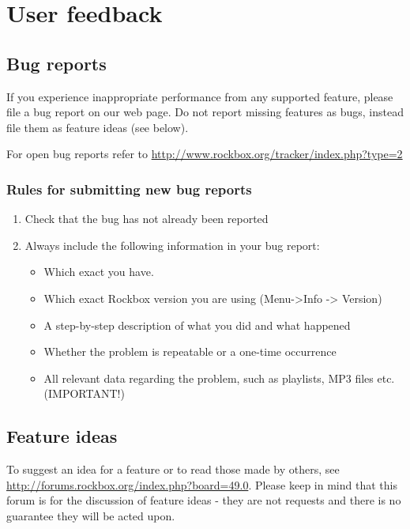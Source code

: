 \appendix










\chapter{User feedback}\label{sec:feedback}
\section{Bug reports}
If you experience inappropriate performance from any supported feature,
please file a bug report on our web page. Do not report missing
features as bugs, instead file them as feature ideas (see below).

For open bug reports refer to
\url{http://www.rockbox.org/tracker/index.php?type=2}

\subsection{Rules for submitting new bug reports}

\begin{enumerate}
\item  Check that the bug has not already been reported
\item  Always include the following information in your bug report:

\begin{itemize}
\item  Which exact \dap{} you have.
\item  Which exact Rockbox version you are using
(Menu{}-{\textgreater}Info {}-{\textgreater} Version)
\item  A step{}-by{}-step description of what you did and what happened
\item  Whether the problem is repeatable or a one{}-time occurrence
\item  All relevant data regarding the problem, such as playlists, MP3
files etc. (IMPORTANT!) 
\end{itemize}
\end{enumerate}

\section{Feature ideas}
To suggest an idea for a feature or to read those made by others, see
\url{http://forums.rockbox.org/index.php?board=49.0}.  Please keep in
mind that this forum is for the discussion of feature ideas - they are not
 requests and there is no guarantee they will be acted upon.

